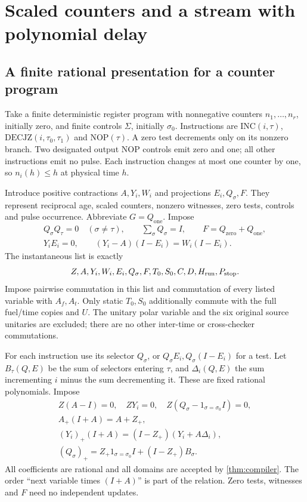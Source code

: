\section{Scaled counters and a stream with polynomial delay}\label{sec:power-machine}
\subsection{A finite rational presentation for a counter program}
Take a finite deterministic register program with nonnegative counters $n_1,\ldots,n_r$, initially zero, and finite controls $\Sigma$, initially $\sigma_0$. Instructions are $\mathrm{INC}(i,\tau)$, $\mathrm{DECJZ}(i,\tau_0,\tau_1)$ and $\mathrm{NOP}(\tau)$. A zero test decrements only on its nonzero branch. Two designated output NOP controls emit zero and one; all other instructions emit no pulse. Each instruction changes at most one counter by one, so $n_i(h)\le h$ at physical time $h$.

Introduce positive contractions $A,Y_i,W_i$ and projections $E_i,Q_\sigma,F$. They represent reciprocal age, scaled counters, nonzero witnesses, zero tests, controls and pulse occurrence. Abbreviate $G=Q_{\mathrm{one}}$. Impose
\begin{equation}\label{eq:power-counter-domains}
 \begin{gathered}
 Q_\sigma Q_\tau=0\quad(\sigma\ne\tau),\qquad\sum_\sigma Q_\sigma=I,\qquad F=Q_{\mathrm{zero}}+Q_{\mathrm{one}},\\
 Y_iE_i=0,\qquad (Y_i-A)(I-E_i)=W_i(I-E_i).
 \end{gathered}
\end{equation}
The instantaneous list is exactly
\[
 Z,A,Y_i,W_i,E_i,Q_\sigma,F,T_0,S_0,C,D,H_{\rm run},P_{\rm stop}.
\]
Impose pairwise commutation in this list and commutation of every listed variable with $A_f,A_t$. Only static $T_0,S_0$ additionally commute with the full fuel/time copies and $U$. The unitary polar variable and the six original source unitaries are excluded; there are no other inter-time or cross-checker commutations.

For each instruction use its selector $Q_\sigma$, or $Q_\sigma E_i,Q_\sigma(I-E_i)$ for a test. Let $B_\tau(Q,E)$ be the sum of selectors entering $\tau$, and $\Delta_i(Q,E)$ the sum incrementing $i$ minus the sum decrementing it. These are fixed rational polynomials. Impose
\begin{equation}\label{eq:power-counter-update}
 \begin{gathered}
 Z(A-I)=0,\quad ZY_i=0,\quad Z(Q_\sigma-1_{\sigma=\sigma_0}I)=0,\\
 A_+(I+A)=A+Z_+,\\
 (Y_i)_+(I+A)=(I-Z_+)(Y_i+A\Delta_i),\\
 (Q_\sigma)_+=Z_+1_{\sigma=\sigma_0}I+(I-Z_+)B_\sigma.
 \end{gathered}
\end{equation}
All coefficients are rational and all domains are accepted by \cref{thm:compiler}. The order ``next variable times $(I+A)$'' is part of the relation. Zero tests, witnesses and $F$ need no independent updates.

